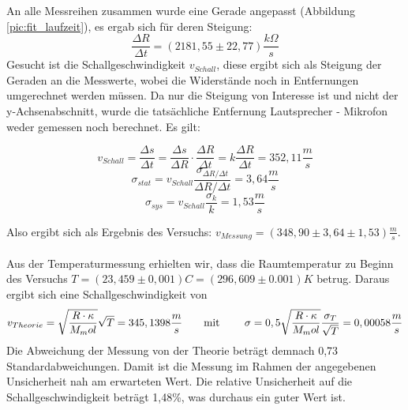 \documentclass[12pt,a4paper]{article}
\begin{document}
	An alle Messreihen zusammen wurde eine Gerade angepasst (Abbildung \ref{pic:fit_laufzeit}), es ergab sich für deren Steigung:
	\begin{equation}
	\frac{\Delta R}{\Delta t} = (2181,55 \pm 22,77) \frac{k\Omega}{s}
	\end{equation} 
	Gesucht ist die Schallgeschwindigkeit $v_{Schall}$, diese ergibt sich als Steigung der Geraden an die Messwerte, wobei die Widerstände noch in Entfernungen umgerechnet werden müssen. Da nur die Steigung von Interesse ist und nicht der y-Achsenabschnitt, wurde die tatsächliche  Entfernung Lautsprecher - Mikrofon weder gemessen noch berechnet. Es gilt:
	
	\begin{equation}
	v_{Schall} = \frac{\Delta s}{\Delta t} = \frac{\Delta s}{\Delta R} \cdot \frac{\Delta R}{\Delta t} = k \frac{\Delta R}{\Delta t} = 352,11 \frac{m}{s}
	\end{equation}
	\begin{equation}
	\sigma_{stat} = v_{Schall} \frac{\sigma _{\Delta R / \Delta t}}{\Delta R / \Delta t} = 3,64 \frac{m}{s}
	\end{equation}
	\begin{equation}
	\sigma_{sys} = v_{Schall} \frac{\sigma _k}{k} = 1,53 \frac{m}{s}
	\end{equation}
	
	Also ergibt sich als Ergebnis des Versuchs: $v_{Messung} = (348,90 \pm 3,64 \pm 1,53) \frac{m}{s}$. \\\\
	Aus der Temperaturmessung erhielten wir, dass die Raumtemperatur zu Beginn des Versuchs $T = (23,459 \pm 0,001)C = (296,609 \pm 0.001)K$ betrug.
	Daraus ergibt sich eine Schallgeschwindigkeit von
	\begin{equation}
	v_{Theorie} =\sqrt{\frac{R\cdot\kappa}{M_mol}}\sqrt{T} = 345,1398 \frac{m}{s} \text{\qquad mit \qquad}
	\sigma = 0,5 \sqrt{\frac{R\cdot\kappa}{M_mol}} \frac{\sigma_T}{\sqrt{T}} = 0,00058 \frac{m}{s}
	\end{equation}
	Die Abweichung der Messung von der Theorie beträgt demnach 0,73 Standardabweichungen. Damit ist die Messung im Rahmen der angegebenen Unsicherheit nah am erwarteten Wert. Die relative Unsicherheit auf die Schallgeschwindigkeit beträgt 1,48\%, was durchaus ein guter Wert ist.
	
\end{document}
